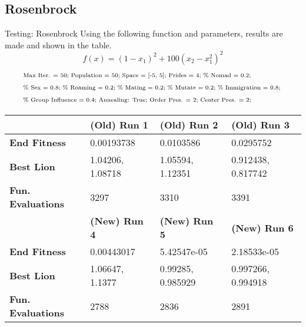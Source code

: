 \documentclass[xcolor=table]{beamer}
\begin{document}
\subsection{Rosenbrock}
\begin{frame}{Testing: Rosenbrock}
  Using the following function and parameters, results are made and shown in the table.
  $$
    f(x) = (1-x_1)^2+100(x_2-x_1^2)^2
  $$
  \begin{align*}
    &\text{\scriptsize
      Max Iter. = 50; Population = 50; Space = [-5, 5]; Prides = 4;  \% Nomad = 0.2;
    }\\
    &\text{\scriptsize
      \% Sex = 0.8; \% Roaming = 0.2; \% Mating = 0.2; \% Mutate = 0.2; \% Immigration = 0.8;
    }\\
    &\text{\scriptsize
       \% Group Influence = 0.4; Annealing: True; Order Pres. = 2; Center Pres. = 2;
    }
  \end{align*}
  \begin{table}[]
    \small
  \begin{tabular}{l|l|l|l|}
  \cline{2-4}
                                                  & \textbf{(Old) Run 1} & \textbf{(Old) Run 2} & \textbf{(Old) Run 3} \\ \hline
  \multicolumn{1}{|l|}{\textbf{End Fitness}}      & 0.00193738           & 0.0103586            & 0.0295752            \\ \hline
  \multicolumn{1}{|l|}{\textbf{Best Lion}}        & 1.04206, 1.08718     & 1.05594,	1.12351     & 0.912438, 0.817742   \\ \hline
  \multicolumn{1}{|l|}{\textbf{Fun. Evaluations}} & 3297                 & 3310                 & 3391                 \\ \hline
                                                  & \textbf{(New) Run 4} & \textbf{(New) Run 5} & \textbf{(New) Run 6} \\ \hline
  \multicolumn{1}{|l|}{\textbf{End Fitness}}      & 0.00443017           & 5.42547e-05          & 2.18533e-05          \\ \hline
  \multicolumn{1}{|l|}{\textbf{Best Lion}}        & 1.06647, 1.1377      & 0.99285, 0.985929    & 0.997266, 0.994918   \\ \hline
  \multicolumn{1}{|l|}{\textbf{Fun. Evaluations}} & 2788                 & 2836                 & 2891                 \\ \hline
  \end{tabular}
  \end{table}
\end{frame}
\end{document}
